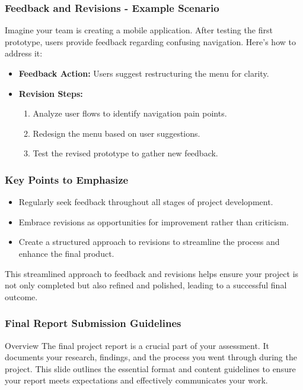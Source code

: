 \documentclass[aspectratio=169]{beamer}
\begin{document}
\begin{frame}[fragile]
    \frametitle{Feedback and Revisions - Example Scenario}
    Imagine your team is creating a mobile application. After testing the first prototype, users provide feedback regarding confusing navigation. Here's how to address it:
    
    \begin{itemize}
        \item \textbf{Feedback Action:} Users suggest restructuring the menu for clarity.
        \item \textbf{Revision Steps:}
            \begin{enumerate}
                \item Analyze user flows to identify navigation pain points.
                \item Redesign the menu based on user suggestions.
                \item Test the revised prototype to gather new feedback.
            \end{enumerate}
    \end{itemize}
\end{frame}

\begin{frame}[fragile]
    \frametitle{Key Points to Emphasize}
    \begin{itemize}
        \item Regularly seek feedback throughout all stages of project development.
        \item Embrace revisions as opportunities for improvement rather than criticism.
        \item Create a structured approach to revisions to streamline the process and enhance the final product.
    \end{itemize}
    
    This streamlined approach to feedback and revisions helps ensure your project is not only completed but also refined and polished, leading to a successful final outcome.
\end{frame}

\begin{frame}[fragile]
    \frametitle{Final Report Submission Guidelines}
    \begin{block}{Overview}
        The final project report is a crucial part of your assessment. It documents your research, findings, and the process you went through during the project. This slide outlines the essential format and content guidelines to ensure your report meets expectations and effectively communicates your work.
    \end{block}
\end{frame}
\end{document}
